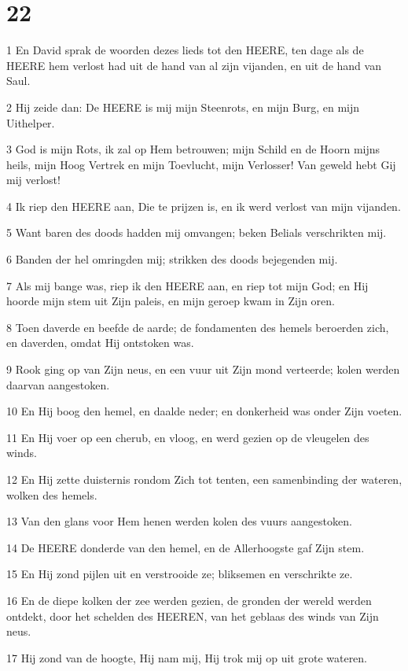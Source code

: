 \chapter{22}

\par 1 En David sprak de woorden dezes lieds tot den HEERE, ten dage als de HEERE hem verlost had uit de hand van al zijn vijanden, en uit de hand van Saul.
\par 2 Hij zeide dan: De HEERE is mij mijn Steenrots, en mijn Burg, en mijn Uithelper.
\par 3 God is mijn Rots, ik zal op Hem betrouwen; mijn Schild en de Hoorn mijns heils, mijn Hoog Vertrek en mijn Toevlucht, mijn Verlosser! Van geweld hebt Gij mij verlost!
\par 4 Ik riep den HEERE aan, Die te prijzen is, en ik werd verlost van mijn vijanden.
\par 5 Want baren des doods hadden mij omvangen; beken Belials verschrikten mij.
\par 6 Banden der hel omringden mij; strikken des doods bejegenden mij.
\par 7 Als mij bange was, riep ik den HEERE aan, en riep tot mijn God; en Hij hoorde mijn stem uit Zijn paleis, en mijn geroep kwam in Zijn oren.
\par 8 Toen daverde en beefde de aarde; de fondamenten des hemels beroerden zich, en daverden, omdat Hij ontstoken was.
\par 9 Rook ging op van Zijn neus, en een vuur uit Zijn mond verteerde; kolen werden daarvan aangestoken.
\par 10 En Hij boog den hemel, en daalde neder; en donkerheid was onder Zijn voeten.
\par 11 En Hij voer op een cherub, en vloog, en werd gezien op de vleugelen des winds.
\par 12 En Hij zette duisternis rondom Zich tot tenten, een samenbinding der wateren, wolken des hemels.
\par 13 Van den glans voor Hem henen werden kolen des vuurs aangestoken.
\par 14 De HEERE donderde van den hemel, en de Allerhoogste gaf Zijn stem.
\par 15 En Hij zond pijlen uit en verstrooide ze; bliksemen en verschrikte ze.
\par 16 En de diepe kolken der zee werden gezien, de gronden der wereld werden ontdekt, door het schelden des HEEREN, van het geblaas des winds van Zijn neus.
\par 17 Hij zond van de hoogte, Hij nam mij, Hij trok mij op uit grote wateren.
